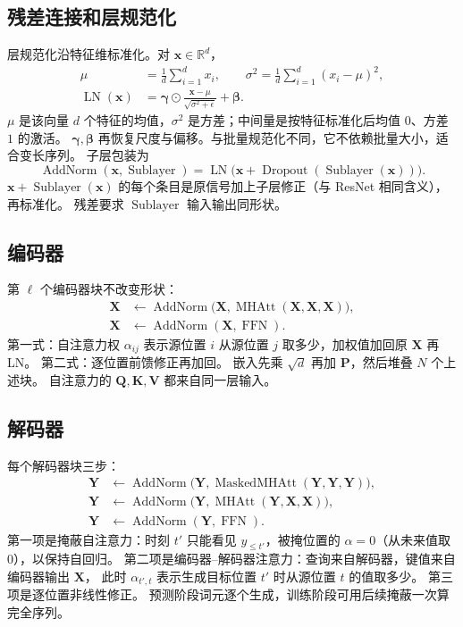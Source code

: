 \subsection{残差连接和层规范化}

层规范化沿特征维标准化。对 $\bm{x}\in\mathbb{R}^{d}$，
\begin{align*}
\mu&=\frac{1}{d}\sum_{i=1}^{d}x_i,
\qquad
\sigma^{2}=\frac{1}{d}\sum_{i=1}^{d}(x_i-\mu)^{2},
\\
\operatorname{LN}(\bm{x})
&=
\bm{\gamma}\odot\frac{\bm{x}-\mu}{\sqrt{\sigma^{2}+\epsilon}}+\bm{\beta}.
\end{align*}
$\mu$ 是该向量 $d$ 个特征的均值，$\sigma^{2}$ 是方差；中间量是按特征标准化后均值 $0$、方差 $1$ 的激活。
$\bm{\gamma},\bm{\beta}$ 再恢复尺度与偏移。与批量规范化不同，它不依赖批量大小，适合变长序列。
子层包装为
\[
\operatorname{AddNorm}(\bm{x},\operatorname{Sublayer})
=
\operatorname{LN}\bigl(\bm{x}+\operatorname{Dropout}(\operatorname{Sublayer}(\bm{x}))\bigr).
\]
$\bm{x}+\operatorname{Sublayer}(\bm{x})$ 的每个条目是原信号加上子层修正（与 ResNet 相同含义），再标准化。
残差要求 $\operatorname{Sublayer}$ 输入输出同形状。

\subsection{编码器}

第 $\ell$ 个编码器块不改变形状：
\begin{align*}
\bm{X}
&\leftarrow
\operatorname{AddNorm}\bigl(\bm{X},\operatorname{MHAtt}(\bm{X},\bm{X},\bm{X})\bigr),
\\
\bm{X}
&\leftarrow
\operatorname{AddNorm}(\bm{X},\operatorname{FFN}).
\end{align*}
第一式：自注意力权 $\alpha_{ij}$ 表示源位置 $i$ 从源位置 $j$ 取多少，加权值加回原 $\bm{X}$ 再 LN。
第二式：逐位置前馈修正再加回。
嵌入先乘 $\sqrt{d}$ 再加 $\bm{P}$，然后堆叠 $N$ 个上述块。
自注意力的 $\bm{Q},\bm{K},\bm{V}$ 都来自同一层输入。

\subsection{解码器}

每个解码器块三步：
\begin{align*}
\bm{Y}
&\leftarrow
\operatorname{AddNorm}\bigl(\bm{Y},\operatorname{MaskedMHAtt}(\bm{Y},\bm{Y},\bm{Y})\bigr),
\\
\bm{Y}
&\leftarrow
\operatorname{AddNorm}\bigl(\bm{Y},\operatorname{MHAtt}(\bm{Y},\bm{X},\bm{X})\bigr),
\\
\bm{Y}
&\leftarrow
\operatorname{AddNorm}(\bm{Y},\operatorname{FFN}).
\end{align*}
第一项是掩蔽自注意力：时刻 $t'$ 只能看见 $y_{\le t'}$，被掩位置的 $\alpha=0$（从未来值取 $0$），以保持自回归。
第二项是编码器--解码器注意力：查询来自解码器，键值来自编码器输出 $\bm{X}$，
此时 $\alpha_{t',t}$ 表示生成目标位置 $t'$ 时从源位置 $t$ 的值取多少。
第三项是逐位置非线性修正。
预测阶段词元逐个生成，训练阶段可用后续掩蔽一次算完全序列。


